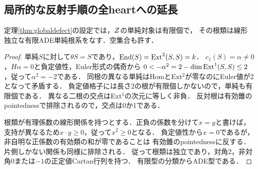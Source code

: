 \subsection{局所的な反射手順の全heartへの延長}
\begin{lemma}[境界非交叉単純の有限ADE性]\label{lem:finiteADEautomatic}
定理\ref{thm:globaldefect}の設定では，$\mathcal Z$の単純対象は有限個で，
その根類は線形独立な有限ADE単純根系をなす．空集合も許す．
\end{lemma}
\begin{proof}
単純$S$に対して$\theta S=S$であり，$\operatorname{End}(S)=\operatorname{Ext}^2(S,S)=k$．
$c_1(S)=\alpha\ne0$，$H\alpha=0$と負定値性，Euler形式の偶奇から
$0<-\alpha^2=2-\dim\operatorname{Ext}^1(S,S)\le2$，従って$\alpha^2=-2$である．
同根の異なる単純はHomとExt$^2$が零なのにEuler値が2となって矛盾する．
負定値格子には長さ2の根が有限個しかないので，単純も有限個である．
異なる二根の交点はExt$^1$の次元に等しく非負．
反対根は有効錐のpointednessで排除されるので，交点は0か1である．

根類が有理係数の線形関係を持つとする．正負の係数を分けて$x=y$と書けば，
支持が異なるため$x\cdot y\ge0$，従って$x^2\ge0$となる．
負定値性から$x=0$であるが，非自明な正係数の有効類の和が零であることは
有効錐のpointednessに反する．片側しかない関係も同様に排除される．
従って根類は独立であり，対角2，非対角0または$-1$の正定値Cartan行列を持つ．
有限型の分類からADE型である．
\end{proof}

